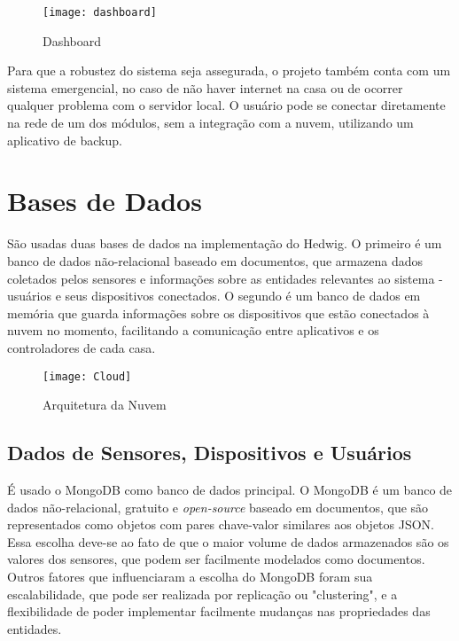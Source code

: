 \begin{figure}[htb]
	\caption{\label{fig:dashboard}Dashboard}
	\begin{center}
		\texttt{[image: dashboard]}
	\end{center}
\end{figure}

Para que a robustez do sistema seja assegurada, o projeto também conta com um sistema emergencial, no caso de não haver internet na casa ou de ocorrer qualquer problema com o servidor local. O usuário pode se conectar diretamente na rede de um dos módulos, sem a integração com a nuvem, utilizando um aplicativo de backup.

\section{Bases de Dados}

São usadas duas bases de dados na implementação do Hedwig. O primeiro é um banco de dados não-relacional baseado em documentos, que armazena dados coletados pelos sensores e informações sobre as entidades relevantes ao sistema - usuários e seus dispositivos conectados. O segundo é um banco de dados em memória que guarda informações sobre os dispositivos que estão conectados à nuvem no momento, facilitando a comunicação entre aplicativos e os controladores de cada casa.

\begin{figure}[H]
	\caption{\label{fig:Cloud}Arquitetura da Nuvem}
	\begin{center}
		\texttt{[image: Cloud]}
	\end{center}
\end{figure}

\subsection{Dados de Sensores, Dispositivos e Usuários}

É usado o MongoDB como banco de dados principal. O MongoDB é um banco de dados não-relacional, gratuito e \emph{open-source} baseado em documentos, que são representados como objetos com pares chave-valor similares aos objetos JSON. Essa escolha deve-se ao fato de que o maior volume de dados armazenados são os valores dos sensores, que podem ser facilmente modelados como documentos. Outros fatores que influenciaram a escolha do MongoDB foram sua escalabilidade, que pode ser realizada por replicação ou "clustering", e a flexibilidade de poder implementar facilmente mudanças nas propriedades das entidades.

